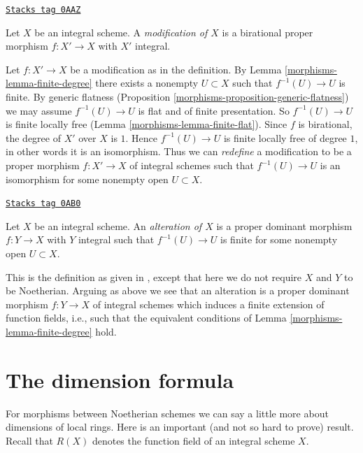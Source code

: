 \begin{definition}[Modification]
\label{morphisms-definition-modification}
\href{https://stacks.math.columbia.edu/tag/0AAZ}{\texttt{Stacks tag 0AAZ}}

Let $X$ be an integral scheme. A {\it modification of $X$}
is a birational proper morphism $f : X' \to X$ with $X'$
integral.
\end{definition}

Let $f : X' \to X$ be a modification as in the definition. By
Lemma \ref{morphisms-lemma-finite-degree} there exists a nonempty $U \subset X$ such
that $f^{-1}(U) \to U$ is finite. By generic flatness
(Proposition \ref{morphisms-proposition-generic-flatness})
we may assume $f^{-1}(U) \to U$ is flat and of finite presentation.
So $f^{-1}(U) \to U$ is finite locally free (Lemma \ref{morphisms-lemma-finite-flat}).
Since $f$ is birational, the degree of $X'$ over $X$ is $1$.
Hence $f^{-1}(U) \to U$ is finite locally free of degree $1$,
in other words it is an isomorphism. Thus we can {\it redefine} a
modification to be a proper morphism $f : X' \to X$ of integral schemes
such that $f^{-1}(U) \to U$ is an isomorphism for some nonempty open
$U \subset X$.

\begin{definition}[Alteration]
\label{morphisms-definition-alteration}
\href{https://stacks.math.columbia.edu/tag/0AB0}{\texttt{Stacks tag 0AB0}}

\begin{reference}
\cite[Definition 2.20]{alterations}
\end{reference}
Let $X$ be an integral scheme. An {\it alteration of $X$}
is a proper dominant morphism $f : Y \to X$ with $Y$ integral such
that $f^{-1}(U) \to U$ is finite for some nonempty open $U \subset X$.
\end{definition}

This is the definition as given in \cite{alterations}, except that
here we do not require $X$ and $Y$ to be Noetherian. Arguing as above
we see that an alteration is a proper dominant morphism $f : Y \to X$
of integral schemes which induces a finite extension of
function fields, i.e., such that the equivalent conditions of
Lemma \ref{morphisms-lemma-finite-degree} hold.

\section{The dimension formula}
\label{morphisms-section-dimension-formula}
For morphisms between Noetherian schemes we can say a little more
about dimensions of local rings. Here is an important (and not so
hard to prove) result. Recall that $R(X)$ denotes the function field
of an integral scheme $X$.

